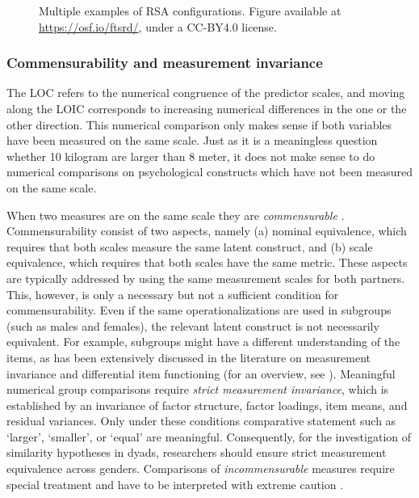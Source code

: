 \documentclass[jou,a4paper,draftfirst]{apa6}
\begin{document}
\begin{figure*}[ht!]
\centering
{}
\caption{Multiple examples of RSA configurations. Figure available at \url{https://osf.io/ftsrd/}, under a CC-BY4.0 license.}
\label{fig:multipleRSA}
\end{figure*}

\subsubsection{Commensurability and measurement invariance}
The LOC refers to the numerical congruence of the predictor scales, and moving along the LOIC corresponds to increasing numerical differences in the one or the other direction. This numerical comparison only makes sense if both variables have been measured on the same scale. Just as it is a meaningless question whether 10 kilogram are larger than 8 meter, it does not make sense to do numerical comparisons on psychological constructs which have not been measured on the same scale. 

When two measures are on the same scale they are \emph{commensurable} \parencite{edwards_relationship_2007}. Commensurability consist of two aspects, namely (a) nominal equivalence, which requires that both scales measure the same latent construct, and (b) scale equivalence, which requires that both scales have the same metric. These aspects are typically addressed by using the same measurement scales for both partners. This, however, is only a necessary but not a sufficient condition for commensurability. Even if the same operationalizations are used in subgroups (such as males and females), the relevant latent construct is not necessarily equivalent. For example, subgroups might have a different understanding of the items, as has been extensively discussed in the literature on measurement invariance and differential item functioning (for an overview, see ). Meaningful numerical group comparisons require \emph{strict measurement invariance}, which is established by an invariance of factor structure, factor loadings, item means, and residual variances. Only under these conditions comparative statement such as `larger', `smaller', or `equal' are meaningful. Consequently, for the investigation of similarity hypotheses in dyads, researchers should ensure strict measurement equivalence across genders. Comparisons of \textit{incommensurable} measures require special treatment and have to be interpreted with extreme caution \parencite{schonbrodt_testing_2015}.
\end{document}
